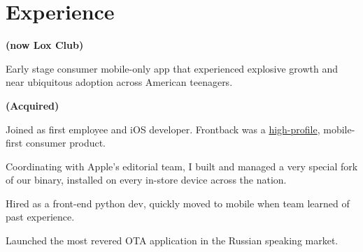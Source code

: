 \documentclass[]{plushcv}
\begin{document}




\begin{minipage}[t]{0.70\textwidth} 

\section{Experience}
\vspace{\topsep} 
\sectionsep
\sectionsep

 \textbf{(now Lox Club)}
\vspace{\topsep}
\begin{tightemize}
\sectionsep
\item Early stage consumer mobile-only app that experienced explosive growth and near ubiquitous adoption across American teenagers.
\end{tightemize}
\sectionsep

 \textbf{(Acquired)}
\begin{tightemize}
\item Joined as first employee and iOS developer. Frontback was a \href{https://techcrunch.com/tag/frontback/}{high-profile}, mobile-first consumer product.
\item Coordinating with Apple's editorial team, I built and managed a very special fork of our binary, installed on every in-store device across the nation.
\end{tightemize}
\sectionsep

\begin{tightemize}
\item Hired as a front-end python dev, quickly moved to mobile when team learned of past experience.
\item Launched the most revered OTA application in the Russian speaking market.
\end{tightemize}
\sectionsep


\end{minipage}
\end{document}
